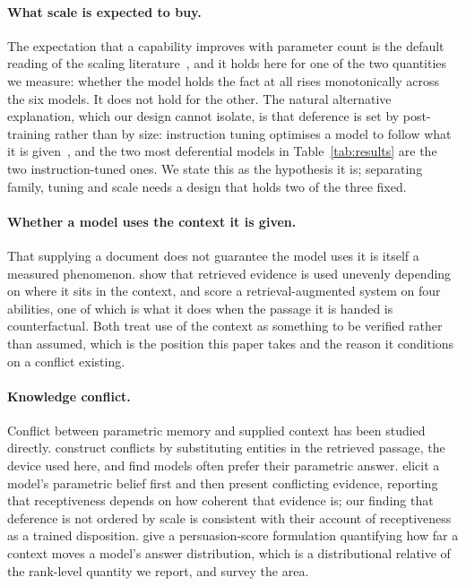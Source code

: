 \documentclass{article}
\begin{document}
\paragraph{What scale is expected to buy.}
The expectation that a capability improves with parameter count is the
default reading of the scaling literature~\citep{kaplan2020scaling,
hoffmann2022chinchilla}, and it holds here for one of the two quantities we
measure: whether the model holds the fact at all rises monotonically across
the six models. It does not hold for the other. The natural alternative
explanation, which our design cannot isolate, is that deference is set by
post-training rather than by size: instruction tuning optimises a model to
follow what it is given~\citep{ouyang2022instructgpt, wei2022flan}, and the
two most deferential models in Table~\ref{tab:results} are the two
instruction-tuned ones. We state this as the hypothesis it is; separating
family, tuning and scale needs a design that holds two of the three fixed.

\paragraph{Whether a model uses the context it is given.}
That supplying a document does not guarantee the model uses it is itself a
measured phenomenon. \citet{liu2024lost} show that retrieved evidence is used
unevenly depending on where it sits in the context, and
\citet{chen2024benchmarking} score a retrieval-augmented system on four
abilities, one of which is what it does when the passage it is handed is
counterfactual. Both treat use of the
context as something to be verified rather than assumed, which is the
position this paper takes and the reason it conditions on a conflict
existing.

\paragraph{Knowledge conflict.}
Conflict between parametric memory and supplied context has been studied
directly. \citet{longpre2021entity} construct conflicts by substituting entities
in the retrieved passage, the device used here, and find models often prefer
their parametric answer. \citet{xie2024conflicts} elicit a model's parametric
belief first and then present conflicting evidence, reporting that receptiveness
depends on how coherent that evidence is; our finding that deference is not
ordered by scale is consistent with their account of receptiveness as a trained
disposition. \citet{du2024context} give a persuasion-score formulation
quantifying how far a context moves a model's answer distribution, which is a
distributional relative of the rank-level quantity we report, and
\citet{xu2024conflicts} survey the area.
\end{document}
